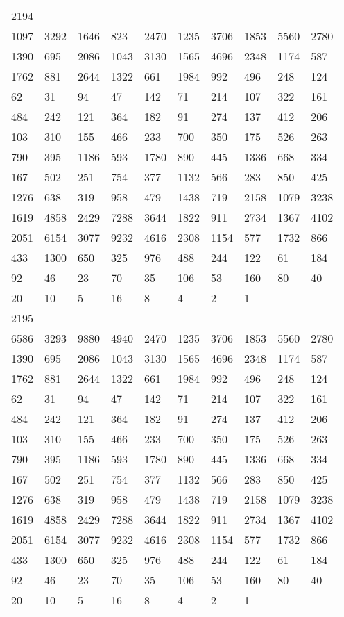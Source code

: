 \begin{longtable}{*{10}{l}}
2194&&&&&&&&&\\
1097& 3292& 1646& 823& 2470& 1235& 3706& 1853& 5560& 2780\\
1390& 695& 2086& 1043& 3130& 1565& 4696& 2348& 1174& 587\\
1762& 881& 2644& 1322& 661& 1984& 992& 496& 248& 124\\
62& 31& 94& 47& 142& 71& 214& 107& 322& 161\\
484& 242& 121& 364& 182& 91& 274& 137& 412& 206\\
103& 310& 155& 466& 233& 700& 350& 175& 526& 263\\
790& 395& 1186& 593& 1780& 890& 445& 1336& 668& 334\\
167& 502& 251& 754& 377& 1132& 566& 283& 850& 425\\
1276& 638& 319& 958& 479& 1438& 719& 2158& 1079& 3238\\
1619& 4858& 2429& 7288& 3644& 1822& 911& 2734& 1367& 4102\\
2051& 6154& 3077& 9232& 4616& 2308& 1154& 577& 1732& 866\\
433& 1300& 650& 325& 976& 488& 244& 122& 61& 184\\
92& 46& 23& 70& 35& 106& 53& 160& 80& 40\\
20& 10& 5& 16& 8& 4& 2& 1& \\

2195&&&&&&&&&\\
6586& 3293& 9880& 4940& 2470& 1235& 3706& 1853& 5560& 2780\\
1390& 695& 2086& 1043& 3130& 1565& 4696& 2348& 1174& 587\\
1762& 881& 2644& 1322& 661& 1984& 992& 496& 248& 124\\
62& 31& 94& 47& 142& 71& 214& 107& 322& 161\\
484& 242& 121& 364& 182& 91& 274& 137& 412& 206\\
103& 310& 155& 466& 233& 700& 350& 175& 526& 263\\
790& 395& 1186& 593& 1780& 890& 445& 1336& 668& 334\\
167& 502& 251& 754& 377& 1132& 566& 283& 850& 425\\
1276& 638& 319& 958& 479& 1438& 719& 2158& 1079& 3238\\
1619& 4858& 2429& 7288& 3644& 1822& 911& 2734& 1367& 4102\\
2051& 6154& 3077& 9232& 4616& 2308& 1154& 577& 1732& 866\\
433& 1300& 650& 325& 976& 488& 244& 122& 61& 184\\
92& 46& 23& 70& 35& 106& 53& 160& 80& 40\\
20& 10& 5& 16& 8& 4& 2& 1& \\


\end{longtable}
